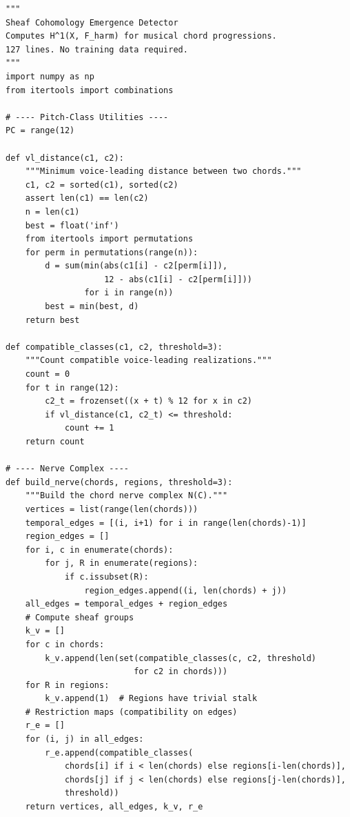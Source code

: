 \documentclass[12pt,a4paper]{article}
\begin{document}
\begin{lstlisting}[caption={Sheaf cohomology emergence detector (127 lines).}, 
  label={lst:code}]
"""
Sheaf Cohomology Emergence Detector
Computes H^1(X, F_harm) for musical chord progressions.
127 lines. No training data required.
"""
import numpy as np
from itertools import combinations

# ---- Pitch-Class Utilities ----
PC = range(12)

def vl_distance(c1, c2):
    """Minimum voice-leading distance between two chords."""
    c1, c2 = sorted(c1), sorted(c2)
    assert len(c1) == len(c2)
    n = len(c1)
    best = float('inf')
    from itertools import permutations
    for perm in permutations(range(n)):
        d = sum(min(abs(c1[i] - c2[perm[i]]),
                    12 - abs(c1[i] - c2[perm[i]]))
                for i in range(n))
        best = min(best, d)
    return best

def compatible_classes(c1, c2, threshold=3):
    """Count compatible voice-leading realizations."""
    count = 0
    for t in range(12):
        c2_t = frozenset((x + t) % 12 for x in c2)
        if vl_distance(c1, c2_t) <= threshold:
            count += 1
    return count

# ---- Nerve Complex ----
def build_nerve(chords, regions, threshold=3):
    """Build the chord nerve complex N(C)."""
    vertices = list(range(len(chords)))
    temporal_edges = [(i, i+1) for i in range(len(chords)-1)]
    region_edges = []
    for i, c in enumerate(chords):
        for j, R in enumerate(regions):
            if c.issubset(R):
                region_edges.append((i, len(chords) + j))
    all_edges = temporal_edges + region_edges
    # Compute sheaf groups
    k_v = []
    for c in chords:
        k_v.append(len(set(compatible_classes(c, c2, threshold)
                          for c2 in chords)))
    for R in regions:
        k_v.append(1)  # Regions have trivial stalk
    # Restriction maps (compatibility on edges)
    r_e = []
    for (i, j) in all_edges:
        r_e.append(compatible_classes(
            chords[i] if i < len(chords) else regions[i-len(chords)],
            chords[j] if j < len(chords) else regions[j-len(chords)],
            threshold))
    return vertices, all_edges, k_v, r_e


\end{lstlisting}
\end{document}
